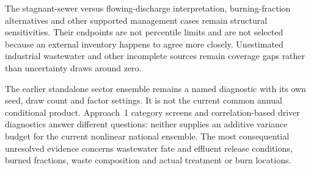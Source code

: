 The stagnant-sewer versus flowing-discharge interpretation, burning-fraction alternatives and other supported management cases remain structural sensitivities. Their endpoints are not percentile limits and are not selected because an external inventory happens to agree more closely. Unestimated industrial wastewater and other incomplete sources remain coverage gaps rather than uncertainty draws around zero.

The earlier standalone sector ensemble remains a named diagnostic with its own seed, draw count and factor settings. It is not the current common annual conditional product. Approach~1 category screens and correlation-based driver diagnostics answer different questions: neither supplies an additive variance budget for the current nonlinear national ensemble. The most consequential unresolved evidence concerns wastewater fate and effluent release conditions, burned fractions, waste composition and actual treatment or burn locations.
